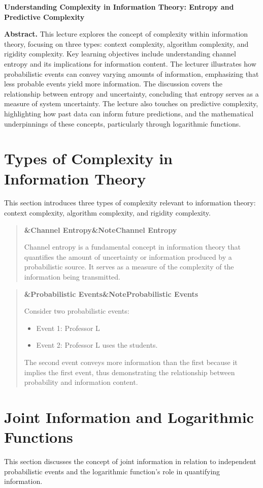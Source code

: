 \documentclass[a4paper]{article}
\newcommand{\boxheading}[1]{%
  \par\smallskip
  \noindent\textbf{\ifx&#1&Note\else#1\fi}\par
  \smallskip
}
\newenvironment{defbox}[1][]{%
  \begin{quote}\color{green!40!black}\boxheading{#1}\normalcolor
}{\end{quote}}
\newenvironment{exbox}[1][]{%
  \begin{quote}\color{brown!70!black}\boxheading{#1}\normalcolor
}{\end{quote}}
\begin{document}
\begin{center}
{\LARGE \textbf{Understanding Complexity in Information Theory: Entropy and Predictive Complexity}}\\[1em]
\end{center}

\textbf{Abstract.} This lecture explores the concept of complexity within information theory, focusing on three types: context complexity, algorithm complexity, and rigidity complexity. Key learning objectives include understanding channel entropy and its implications for information content. The lecturer illustrates how probabilistic events can convey varying amounts of information, emphasizing that less probable events yield more information. The discussion covers the relationship between entropy and uncertainty, concluding that entropy serves as a measure of system uncertainty. The lecture also touches on predictive complexity, highlighting how past data can inform future predictions, and the mathematical underpinnings of these concepts, particularly through logarithmic functions.

\section{Types of Complexity in Information Theory}
This section introduces three types of complexity relevant to information theory: context complexity, algorithm complexity, and rigidity complexity.

\begin{defbox}[Channel Entropy]
Channel entropy is a fundamental concept in information theory that quantifies the amount of uncertainty or information produced by a probabilistic source. It serves as a measure of the complexity of the information being transmitted.
\end{defbox}

\begin{exbox}[Probabilistic Events]
Consider two probabilistic events:
\begin{itemize}
    \item Event 1: Professor L
    \item Event 2: Professor L uses the students.
\end{itemize}
The second event conveys more information than the first because it implies the first event, thus demonstrating the relationship between probability and information content.
\end{exbox}

\section{Joint Information and Logarithmic Functions}
This section discusses the concept of joint information in relation to independent probabilistic events and the logarithmic function's role in quantifying information.
\end{document}
